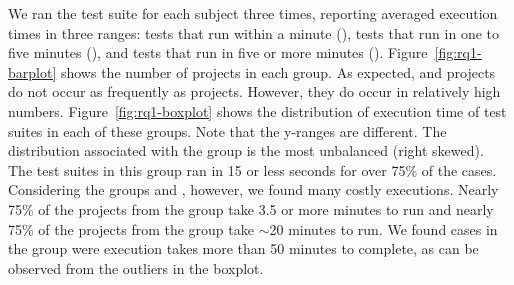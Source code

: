 We ran the test suite for each subject three times, reporting averaged
execution times in three ranges: tests that run within a minute
(\shortg{}), tests that run in one to five minutes (\medg{}), and
tests that run in five or more minutes (\longg{}). Figure~\ref{fig:rq1-barplot} shows the number of projects in
each group.  As expected, \longg{} and \medg{} projects do not occur
as frequently as \shortg{} projects.  However, they do occur in
relatively high numbers.
Figure~\ref{fig:rq1-boxplot} shows the distribution of execution time of
test suites in each of these groups.
Note that the y-ranges are different.
The distribution associated with the \shortg{} group is the most
unbalanced (right skewed).
The test suites in this group ran in 15 or less seconds for
over 75\% of the cases. Considering the groups \medg{} and \longg{},
however, we found many costly executions.  Nearly 75\% of the projects
from the \medg{} group take 3.5 or more minutes to run and nearly 75\% of
the projects from the \longg{} group take $\sim$20 minutes to run.  We
found cases in the \longg{} group were execution takes more than 50 minutes
to complete, as can be observed from the outliers in the boxplot.

